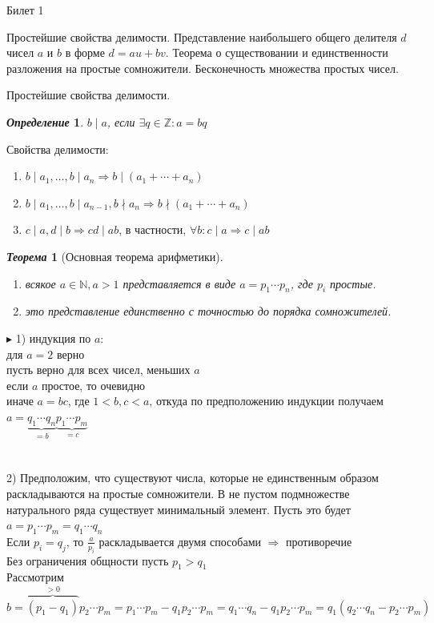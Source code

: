 \documentclass[a4paper,12pt]{article}
\newtheorem{deff}{\textit{Определение}}
\newtheorem{teo}{\textit{Теорема}}
\newcommand{\q}{\quad}
\newcommand{\pb}{\blacktriangleright}
\newcommand{\bb}[1]{\mathbb{#1}}
\begin{document}
\large

\newpage
\begin{mybox}{\hypertarget{bil1}{Билет 1}}

\begin{formbox}{}
Простейшие свойства делимости. Представление наибольшего общего делителя $d$ чисел $a$ и $b$ в форме $d = au+bv$. Теорема о существовании и единственности разложения на простые сомножители. Бесконечность множества простых чисел.
\end{formbox}
Простейшие свойства делимости.
\begin{formbox}{}
\begin{deff} $b\mid a$, если $\exists q\in \mathbb{Z}: a=bq$
\end{deff}
\end{formbox}
Свойства делимости:
\begin{enumerate}
    \item $b\mid a_1, \dots, b\mid a_n \Rightarrow b\mid(a_1+\cdots+a_n)$
    \item $b\mid a_1, \dots, b\mid a_{n-1}, b\nmid a_n \Rightarrow b\nmid (a_1+\cdots+a_n)$
    \item $c\mid a, d\mid b \Rightarrow cd\mid ab$, в частности, $\forall b: c\mid a \Rightarrow c\mid ab$
\end{enumerate}

\begin{formbox}{}
\begin{teo}[Основная теорема арифметики]\q\\
\begin{enumerate}
    \item всякое $a \in \bb{N}, a > 1$ представляется в виде $a = p_1\cdots p_n$, где $p_i$ простые.
    \item это представление единственно с точностью до порядка сомножителей.
\end{enumerate}
\end{teo}
\end{formbox}
$\pb$ 1) индукция по $a$:\\
для $a = 2$ верно\\
пусть верно для всех чисел, меньших $a$\\
если $a$ простое, то очевидно\\
иначе $a = bc$, где $1<b,c<a$, откуда по предположению индукции получаем $a = \underbrace{q_1\cdots q_n}_{=b} \underbrace{p_1\cdots p_m}_{=c}$\\\q\\\q\\
2) Предположим, что существуют числа, которые не единственным образом раскладываются на простые сомножители. В не пустом подмножестве натурального ряда существует минимальный элемент. Пусть это будет $a = p_1\cdots p_m = q_1\cdots q_n$\\
Если $p_i = q_j$, то $\frac{a}{p_i}$ раскладывается двумя способами $\Rightarrow$ противоречие\\
Без ограничения общности пусть $p_1 > q_1$\\
Рассмотрим $b = \overbrace{(p_1 - q_1)}^{>0}p_2\cdots p_m = p_1\cdots p_m - q_1p_2\cdots p_m = q_1\cdots q_n - q_1 p_2\cdots p_m = q_1 (q_2 \cdots q_n - p_2\cdots p_m)$\\
\end{mybox}
\end{document}

